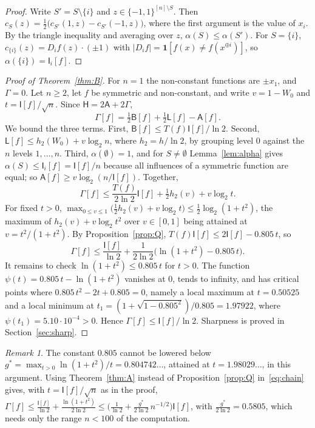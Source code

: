\documentclass[11pt]{amsart}
\theoremstyle{remark}
\newtheorem{remark}[lemma]{Remark}
\newcommand{\bits}{\{-1,1\}}
\newcommand{\HH}{\mathsf H}
\newcommand{\I}{\mathsf I}
\begin{document}
\begin{proof}
Write $S'=S\setminus\{i\}$ and $z\in\bits^{[n]\setminus S}$. Then $c_S(z)=\frac12\bigl(c_{S'}(1,z)-c_{S'}(-1,z)\bigr)$, where the first argument is the value of $x_i$. By the triangle inequality and averaging over $z$, $\alpha(S)\le\alpha(S')$. For $S=\{i\}$, $c_{\{i\}}(z)=D_if(z)\cdot(\pm1)$ with $|D_if|=\mathbf 1[f(x)\ne f(x^{\oplus i})]$, so $\alpha(\{i\})=\I_i[f]$.
\end{proof}

\begin{proof}[Proof of Theorem~\ref{thm:B}]
For $n=1$ the non-constant functions are $\pm x_1$, and $\Gamma=0$. Let $n\ge2$, let $f$ be symmetric and non-constant, and write $v=1-W_0$ and $t=\I[f]/\sqrt n$. Since $\HH=2\mathsf A+2\Gamma$,
\[
 \Gamma[f]=\tfrac12\mathsf B[f]+\tfrac12\mathsf L[f]-\mathsf A[f].
\]
We bound the three terms. First, $\mathsf B[f]\le T(f)\I[f]/\ln2$. Second, $\mathsf L[f]\le h_2(W_0)+v\log_2n$, where $h_2=h/\ln2$, by grouping level $0$ against the $n$ levels $1,\dots,n$. Third, $\alpha(\emptyset)=1$, and for $S\ne\emptyset$ Lemma~\ref{lem:alpha} gives $\alpha(S)\le\I_i[f]=\I[f]/n$ because all influences of a symmetric function are equal; so $\mathsf A[f]\ge v\log_2(n/\I[f])$. Together,
\begin{equation}\label{eq:chain}
 \Gamma[f]\le\frac{T(f)}{2\ln2}\I[f]+\tfrac12h_2(v)+v\log_2t.
\end{equation}
For fixed $t>0$, $\max_{0\le v\le1}\bigl(\frac12h_2(v)+v\log_2t\bigr)\le\frac12\log_2(1+t^2)$, the maximum of $h_2(v)+v\log_2t^2$ over $v\in[0,1]$ being attained at $v=t^2/(1+t^2)$. By Proposition~\ref{prop:Q}, $T(f)\I[f]\le2\I[f]-0.805\,t$, so
\[
 \Gamma[f]\le\frac{\I[f]}{\ln2}+\frac{1}{2\ln2}\bigl(\ln(1+t^2)-0.805\,t\bigr).
\]
It remains to check $\ln(1+t^2)\le0.805\,t$ for $t>0$. The function $\psi(t)=0.805\,t-\ln(1+t^2)$ vanishes at $0$, tends to infinity, and has critical points where $0.805\,t^2-2t+0.805=0$, namely a local maximum at $t=0.50525$ and a local minimum at $t_1=(1+\sqrt{1-0.805^2})/0.805=1.97922$, where $\psi(t_1)=5.10\cdot10^{-4}>0$. Hence $\Gamma[f]\le\I[f]/\ln2$. Sharpness is proved in Section~\ref{sec:sharp}.
\end{proof}

\begin{remark}\label{rem:weak}
The constant $0.805$ cannot be lowered below $g^*=\max_{t>0}\ln(1+t^2)/t=0.804742\dots$, attained at $t=1.98029\dots$, in this argument. Using Theorem~\ref{thm:A} instead of Proposition~\ref{prop:Q} in~\eqref{eq:chain} gives, with $t=\I[f]/\sqrt n$ as in the proof, $\Gamma[f]\le\frac{\I[f]}{\ln2}+\frac{\ln(1+t^2)}{2\ln2}\le\bigl(\frac1{\ln2}+\frac{g^*}{2\ln2}\,n^{-1/2}\bigr)\I[f]$, with $\frac{g^*}{2\ln2}=0.5805$, which needs only the range $n<100$ of the computation.
\end{remark}
\end{document}
